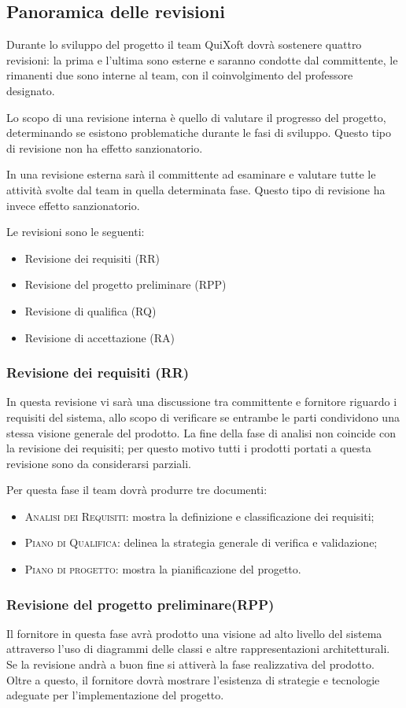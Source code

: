 \documentclass[11pt,a4paper]{article}
\begin{document}
\subsection{Panoramica delle revisioni}
Durante lo sviluppo del progetto il team QuiXoft dovrà sostenere quattro revisioni: la prima e l'ultima sono esterne e saranno condotte dal committente, le rimanenti due sono interne al team, con il coinvolgimento del professore designato.

Lo scopo di una revisione interna è quello di valutare il progresso del progetto, determinando se esistono problematiche durante le fasi di sviluppo.
Questo tipo di revisione non ha effetto sanzionatorio.

In una revisione esterna sarà il committente ad esaminare e valutare tutte le attività svolte dal team in quella determinata fase.
Questo tipo di revisione ha invece effetto sanzionatorio.
\medskip

Le revisioni sono le seguenti:
\begin{itemize}
\item Revisione dei requisiti (RR)
\item Revisione del progetto preliminare (RPP)
\item Revisione di qualifica (RQ)
\item Revisione di accettazione (RA)
\end{itemize}
\subsubsection{Revisione dei requisiti (RR)}
In questa revisione vi sarà una discussione tra committente e fornitore riguardo i requisiti del sistema, allo scopo di verificare se entrambe le parti condividono una stessa visione generale del prodotto.
La fine della fase di analisi non coincide con la revisione dei requisiti; per questo motivo tutti i prodotti portati a questa revisione sono da considerarsi parziali.

Per questa fase il team dovrà produrre tre documenti:
\begin{itemize}
\item \textsc{Analisi dei Requisiti}: mostra la definizione e classificazione dei requisiti;
\item \textsc{Piano di Qualifica}: delinea la strategia generale di verifica e validazione;
\item \textsc{Piano di progetto}: mostra la pianificazione del progetto.
\end{itemize}
\subsubsection{Revisione del progetto preliminare(RPP)}
Il fornitore in questa fase avrà prodotto una visione ad alto livello del sistema attraverso l'uso di diagrammi delle classi e altre rappresentazioni architetturali.
Se la revisione andrà a buon fine si attiverà la fase realizzativa del prodotto.
Oltre a questo, il fornitore dovrà mostrare l'esistenza di strategie e tecnologie adeguate per l'implementazione del progetto.
\end{document}
